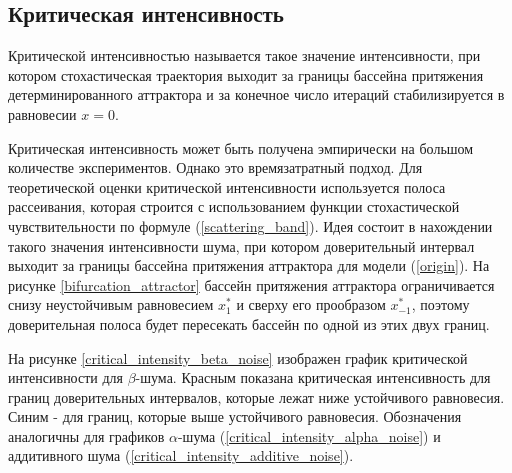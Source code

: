 \subsection{Критическая интенсивность}

    Критической интенсивностью называется такое значение интенсивности, при котором стохастическая траектория выходит за границы бассейна притяжения детерминированного аттрактора и за конечное число итераций стабилизируется в равновесии \(x = 0\).

    Критическая интенсивность может быть получена эмпирически на большом количестве экспериментов. Однако это времязатратный подход. Для теоретической оценки критической интенсивности используется полоса рассеивания, которая строится с использованием функции стохастической чувствительности по формуле (\ref{scattering_band}). Идея состоит в нахождении такого значения интенсивности шума, при котором доверительный интервал выходит за границы бассейна притяжения аттрактора для модели (\ref{origin}). На рисунке \ref{bifurcation_attractor} бассейн притяжения аттрактора ограничивается снизу неустойчивым равновесием \(x_1^*\) и сверху его прообразом \(x_{-1}^*\), поэтому доверительная полоса будет пересекать бассейн по одной из этих двух границ.

    На рисунке \ref{critical_intensity_beta_noise} изображен график критической интенсивности для \(\beta\)-шума. Красным показана критическая интенсивность для границ доверительных интервалов, которые лежат ниже устойчивого равновесия. Синим - для границ, которые выше устойчивого равновесия. Обозначения аналогичны для графиков \(\alpha\)-шума (\ref{critical_intensity_alpha_noise}) и аддитивного шума (\ref{critical_intensity_additive_noise}).


